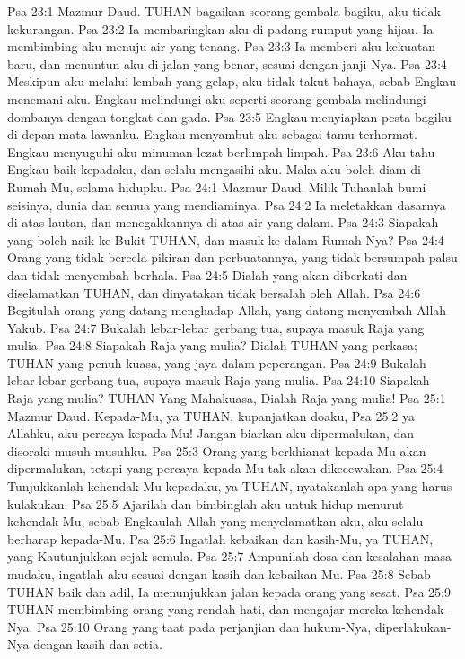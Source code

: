 Psa 23:1  Mazmur Daud. TUHAN bagaikan seorang gembala bagiku, aku tidak kekurangan.
Psa 23:2  Ia membaringkan aku di padang rumput yang hijau. Ia membimbing aku menuju air yang tenang.
Psa 23:3  Ia memberi aku kekuatan baru, dan menuntun aku di jalan yang benar, sesuai dengan janji-Nya.
Psa 23:4  Meskipun aku melalui lembah yang gelap, aku tidak takut bahaya, sebab Engkau menemani aku. Engkau melindungi aku seperti seorang gembala melindungi dombanya dengan tongkat dan gada.
Psa 23:5  Engkau menyiapkan pesta bagiku di depan mata lawanku. Engkau menyambut aku sebagai tamu terhormat. Engkau menyuguhi aku minuman lezat berlimpah-limpah.
Psa 23:6  Aku tahu Engkau baik kepadaku, dan selalu mengasihi aku. Maka aku boleh diam di Rumah-Mu, selama hidupku.
Psa 24:1  Mazmur Daud. Milik Tuhanlah bumi seisinya, dunia dan semua yang mendiaminya.
Psa 24:2  Ia meletakkan dasarnya di atas lautan, dan menegakkannya di atas air yang dalam.
Psa 24:3  Siapakah yang boleh naik ke Bukit TUHAN, dan masuk ke dalam Rumah-Nya?
Psa 24:4  Orang yang tidak bercela pikiran dan perbuatannya, yang tidak bersumpah palsu dan tidak menyembah berhala.
Psa 24:5  Dialah yang akan diberkati dan diselamatkan TUHAN, dan dinyatakan tidak bersalah oleh Allah.
Psa 24:6  Begitulah orang yang datang menghadap Allah, yang datang menyembah Allah Yakub.
Psa 24:7  Bukalah lebar-lebar gerbang tua, supaya masuk Raja yang mulia.
Psa 24:8  Siapakah Raja yang mulia? Dialah TUHAN yang perkasa; TUHAN yang penuh kuasa, yang jaya dalam peperangan.
Psa 24:9  Bukalah lebar-lebar gerbang tua, supaya masuk Raja yang mulia.
Psa 24:10  Siapakah Raja yang mulia? TUHAN Yang Mahakuasa, Dialah Raja yang mulia!
Psa 25:1  Mazmur Daud. Kepada-Mu, ya TUHAN, kupanjatkan doaku,
Psa 25:2  ya Allahku, aku percaya kepada-Mu! Jangan biarkan aku dipermalukan, dan disoraki musuh-musuhku.
Psa 25:3  Orang yang berkhianat kepada-Mu akan dipermalukan, tetapi yang percaya kepada-Mu tak akan dikecewakan.
Psa 25:4  Tunjukkanlah kehendak-Mu kepadaku, ya TUHAN, nyatakanlah apa yang harus kulakukan.
Psa 25:5  Ajarilah dan bimbinglah aku untuk hidup menurut kehendak-Mu, sebab Engkaulah Allah yang menyelamatkan aku, aku selalu berharap kepada-Mu.
Psa 25:6  Ingatlah kebaikan dan kasih-Mu, ya TUHAN, yang Kautunjukkan sejak semula.
Psa 25:7  Ampunilah dosa dan kesalahan masa mudaku, ingatlah aku sesuai dengan kasih dan kebaikan-Mu.
Psa 25:8  Sebab TUHAN baik dan adil, Ia menunjukkan jalan kepada orang yang sesat.
Psa 25:9  TUHAN membimbing orang yang rendah hati, dan mengajar mereka kehendak-Nya.
Psa 25:10  Orang yang taat pada perjanjian dan hukum-Nya, diperlakukan-Nya dengan kasih dan setia.
